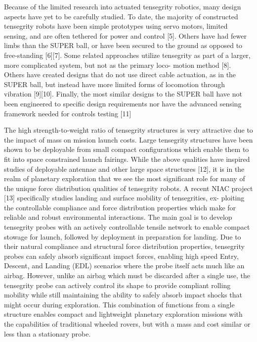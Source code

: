 Because  of  the  limited  research  into  actuated  tensegrity
robotics,   many   design   aspects   have   yet   to   be   carefully
studied. To date, the majority of constructed tensegrity robots
have  been  simple  prototypes  using  servo  motors,  limited
sensing,  and  are  often  tethered  for  power  and  control  [5].
Others have had fewer limbs than the SUPER ball, or have
been  secured  to  the  ground  as  opposed  to  free-standing
[6][7]. Some related approaches utilize tensegrity as part of a
larger, more complicated system, but not as the primary loco-
motion method [8]. Others have created designs that do not
use direct cable actuation, as in the SUPER ball, but instead
have  more  limited  forms  of  locomotion  through  vibration
[9][10]. Finally, the most similar designs to the SUPER ball
have not been engineered to specific design requirements nor
have  the  advanced  sensing  framework  needed  for  controls
testing [11]

The  high  strength-to-weight  ratio  of  tensegrity  structures
is very attractive due to the impact of mass on mission launch
costs.  Large  tensegrity  structures  have  been  shown  to  be
deployable from small compact configurations which enable
them to fit into space constrained launch fairings. While the
above qualities have inspired studies of deployable antennae
and  other  large  space  structures  [12],  it  is  in  the  realm
of  planetary  exploration  that  we  see  the  most  significant
role  for  many  of  the  unique  force  distribution  qualities  of
tensegrity  robots.  A  recent  NIAC  project  [13]  specifically
studies  landing  and  surface  mobility  of  tensegrities,  ex-
ploiting  the  controllable  compliance  and  force  distribution
properties which make for reliable and robust environmental
interactions.
The   main   goal   is   to   develop   tensegrity   probes   with
an  actively  controllable  tensile  network  to  enable  compact
stowage  for  launch,  followed  by  deployment  in  preparation
for  landing.  Due  to  their  natural  compliance  and  structural
force  distribution  properties,  tensegrity  probes  can  safely
absorb significant impact forces, enabling high speed Entry,
Descent, and Landing (EDL) scenarios where the probe itself
acts  much  like  an  airbag.  However,  unlike  an  airbag  which
must  be  discarded  after  a  single  use,  the  tensegrity  probe
can  actively  control  its  shape  to  provide  compliant  rolling
mobility  while  still  maintaining  the  ability  to  safely  absorb
impact  shocks  that  might  occur  during  exploration.  This
combination  of  functions  from  a  single  structure  enables
compact and lightweight planetary exploration missions with
the capabilities of traditional wheeled rovers, but with a mass
and cost similar or less than a stationary probe.

